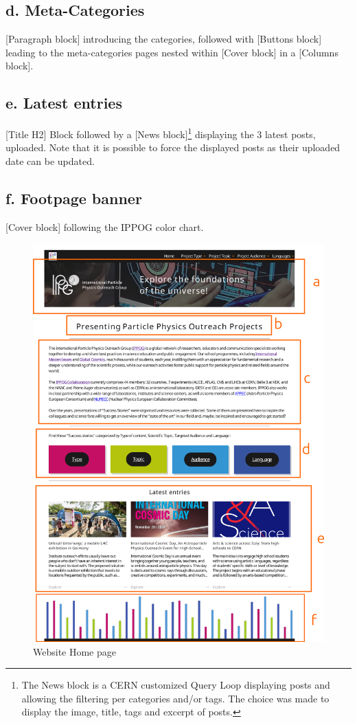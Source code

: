 \subsection*{d. Meta-Categories}
[Paragraph block] introducing the categories, followed with [Buttons block] leading to the meta-categories pages nested within [Cover block] in a [Columns block].

\subsection*{e. Latest entries}
[Title H2] Block followed by a [News block]\footnote{The News block is a CERN customized Query Loop displaying posts and allowing the filtering per categories and/or tags. The choice was made to display the image, title, tags and excerpt of posts.} displaying the 3 latest posts, uploaded. Note that it is possible to force the displayed posts as their uploaded date can be updated.

\subsection*{f. Footpage banner}
[Cover block] following the IPPOG color chart.

\begin{figure}[p]
    \centering
    \includegraphics[width=\linewidth]{Image/Architecture/home_page.png}
    \caption{Website Home page}
    \label{fig:home_page}
\end{figure}

